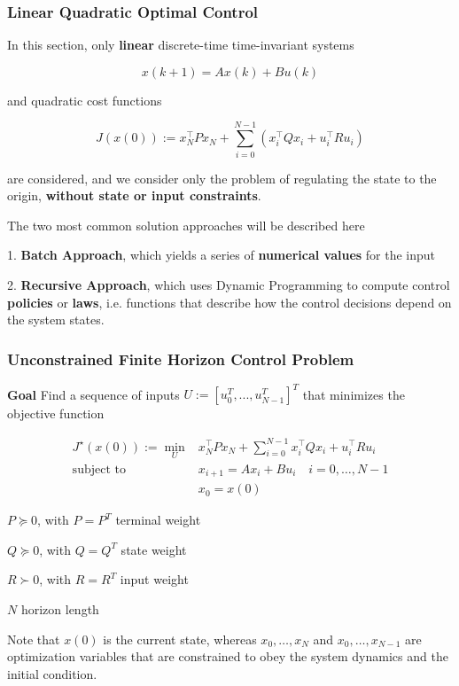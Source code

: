 \subsubsection{Linear Quadratic Optimal Control}

In this section,
only \textbf{linear} discrete-time time-invariant systems

$$x(k + 1) = Ax(k) + Bu(k)$$

and quadratic cost functions

$$
	J(x(0)) :=  x_N^\top P x_N +
	\sum_{i=0}^{N-1}(x_i^\top Q x_i + u_i^\top R u_i)
$$

are considered, and we consider only the problem of
regulating the state to the origin,
\textbf{without state or input constraints}.

The two most common solution approaches will be described here

1. \textbf{Batch Approach}, which yields a
series of \textbf{numerical values} for the input

2. \textbf{Recursive Approach}, which uses Dynamic Programming
to compute control \textbf{policies} or \textbf{laws}, i.e. functions that
describe how the control decisions depend on the system states.

\subsubsection{Unconstrained Finite Horizon Control Problem}
\textbf{Goal} Find a sequence of inputs
$U := [u_0^T,...,u_{N-1}^T]^T$ %
that minimizes the objective function


$$\begin{aligned}
		J^\star(x(0)) :=
		\min_U & x_N^\top P x_N +
		\sum_{i=0}^{N-1}
		x_i^\top Q x_i + u_i^\top R u_i
		\\
		\text{subject to  }
		       & x_{i+1}                = Ax_i+Bu_i
		\quad i  = 0,\dots,N-1                      \\
		       & x_0                    = x(0)
	\end{aligned}$$

$P\succeq0$, with $P=P^T$
terminal weight

$Q\succeq0$, with $Q = Q^T$
state weight

$R\succ0$, with $R = R^T$
input weight

$N$ horizon length

Note that $x(0)$ is the current state, whereas
$x_0,\dots,x_N$ and $x_0,\dots,x_{N-1}$
are optimization variables that are constrained to obey
the system dynamics and the initial condition.

